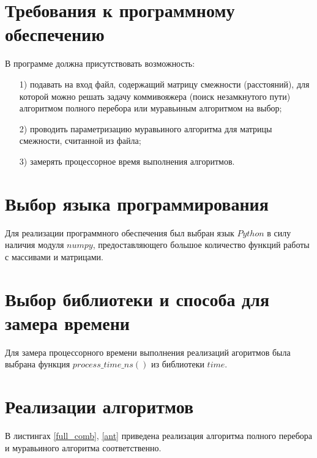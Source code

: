 \documentclass[a4paper,14pt, unknownkeysallowed]{extreport}
\begin{document}
\section{Требования к программному обеспечению}

В программе должна присутствовать возможность:
	
\begin{enumerate}
	\item[1)] подавать на вход файл, содержащий матрицу смежности (расстояний), для которой можно решать задачу коммивояжера (поиск незамкнутого пути) алгоритмом полного перебора или муравьиным алгоритмом на выбор;
	\item[2)] проводить параметризацию муравьиного алгоритма для матрицы смежности, считанной из файла;
	\item[3)] замерять процессорное время выполнения алгоритмов.
\end{enumerate}
	
\section{Выбор языка программирования}
	
Для реализации программного обеспечения был выбран язык $Python$ в силу наличия модуля $numpy$, предоставляющего большое количество функций работы с массивами и матрицами.
	
\section{Выбор библиотеки и способа для замера времени}

Для замера процессорного времени выполнения реализаций агоритмов была выбрана функция $process\_time\_ns()$ из библиотеки $time$.
		
\section{Реализации алгоритмов}
	
В листингах \ref{full_comb}, \ref{ant} приведена реализация алгоритма полного перебора и муравьиного алгоритма соответственно.
\end{document}
